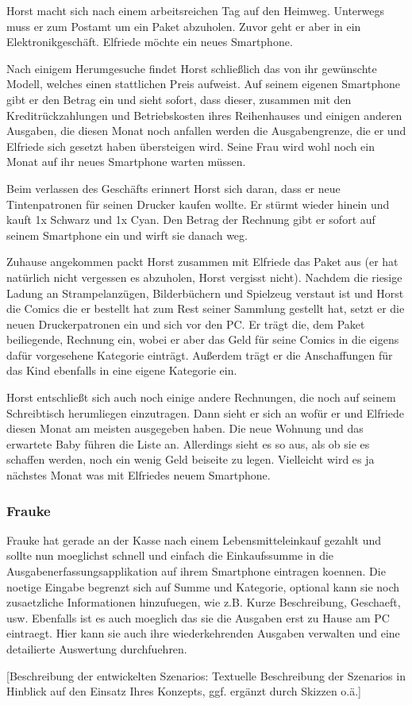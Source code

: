 Horst macht sich nach einem arbeitsreichen Tag auf den Heimweg. Unterwegs muss er zum
Postamt um ein Paket abzuholen. Zuvor geht er aber in ein Elektronikgesch\"aft.
Elfriede m\"ochte ein neues Smartphone.

Nach einigem Herumgesuche findet Horst schlie\ss lich das von ihr gew\"unschte
Modell, welches einen stattlichen Preis aufweist. Auf seinem eigenen
Smartphone gibt er den Betrag ein und sieht sofort, dass dieser, zusammen
mit den Kreditr\"uckzahlungen und Betriebskosten ihres Reihenhauses und
einigen anderen Ausgaben, die diesen Monat noch anfallen werden die
Ausgabengrenze, die er und Elfriede sich gesetzt haben \"ubersteigen wird.
Seine Frau wird wohl noch ein Monat auf ihr neues Smartphone warten
m\"ussen.

Beim verlassen des Gesch\"afts erinnert Horst sich daran, dass er neue
Tintenpatronen für seinen Drucker kaufen wollte. Er st\"urmt wieder hinein
und kauft 1x Schwarz und 1x Cyan. Den Betrag der Rechnung gibt er sofort
auf seinem Smartphone ein und wirft sie danach weg.

Zuhause angekommen packt Horst zusammen mit Elfriede das Paket aus (er hat
nat\"urlich nicht vergessen es abzuholen, Horst vergisst nicht). Nachdem die
riesige Ladung an Strampelanz\"ugen, Bilderb\"uchern und Spielzeug verstaut
ist und Horst die Comics die er bestellt hat zum Rest seiner Sammlung
gestellt hat, setzt er die neuen Druckerpatronen ein und sich vor den PC.
Er tr\"agt die, dem Paket beiliegende, Rechnung ein, wobei er aber das Geld
für seine Comics in die eigens daf\"ur vorgesehene Kategorie eintr\"agt.
Au\ss erdem tr\"agt er die Anschaffungen für das Kind ebenfalls in eine eigene
Kategorie ein.

Horst entschlie\ss t sich auch noch einige andere Rechnungen, die noch auf
seinem Schreibtisch herumliegen einzutragen. Dann sieht er sich an wof\"ur er
und Elfriede diesen Monat am meisten ausgegeben haben. Die neue Wohnung und
das erwartete Baby f\"uhren die Liste an. Allerdings sieht es so aus, als ob
sie es schaffen werden, noch ein wenig Geld beiseite zu legen. Vielleicht
wird es ja n\"achstes Monat was mit Elfriedes neuem Smartphone.

\subsubsection{Frauke}

Frauke hat gerade an der Kasse nach einem Lebensmitteleinkauf gezahlt und
sollte nun moeglichst schnell und einfach die Einkaufssumme in die
Ausgabenerfassungsapplikation auf ihrem Smartphone eintragen koennen. Die 
noetige Eingabe begrenzt sich auf Summe und Kategorie, optional kann sie noch 
zusaetzliche Informationen hinzufuegen, wie z.B. Kurze Beschreibung, Geschaeft, 
usw. Ebenfalls ist es auch moeglich das sie die Ausgaben erst zu Hause am PC 
eintraegt. Hier kann sie auch ihre wiederkehrenden Ausgaben verwalten und eine 
detailierte Auswertung durchfuehren.

[Beschreibung der entwickelten Szenarios: Textuelle Beschreibung der Szenarios in Hinblick auf den Einsatz Ihres Konzepts, ggf. ergänzt durch Skizzen o.ä.]
